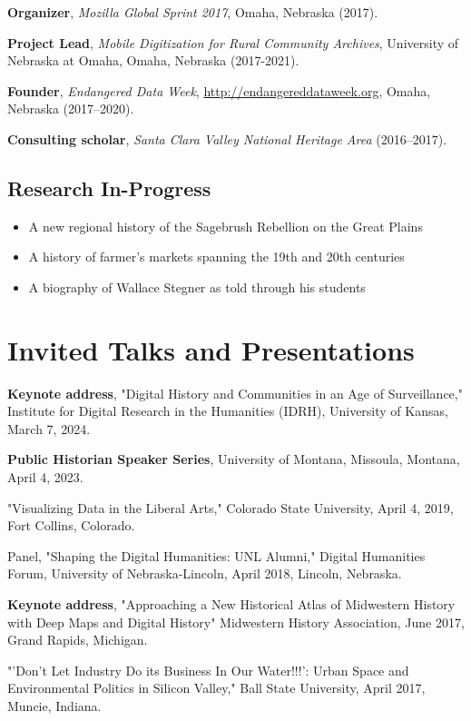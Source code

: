 \documentclass[10pt]{article}
\begin{document}
\textbf{Organizer}, \textit{Mozilla Global Sprint 2017}, Omaha, Nebraska (2017).

\textbf{Project Lead}, \textit{Mobile Digitization for Rural Community Archives}, University of Nebraska at Omaha, Omaha, Nebraska (2017-2021).

\textbf{Founder}, \textit{Endangered Data Week}, \url{http://endangereddataweek.org}, Omaha, Nebraska (2017--2020).

\textbf{Consulting scholar}, \textit{Santa Clara Valley National Heritage Area} (2016--2017).

\subsection*{Research In-Progress}\label{in-progress}

\begin{itemize}
\item A new regional history of the Sagebrush Rebellion on the Great Plains
\item A history of farmer's markets spanning the 19th and 20th centuries
\item A biography of Wallace Stegner as told through his students
\end{itemize}

\section{Invited Talks and Presentations}

\textbf{Keynote address}, "Digital History and Communities in an Age of Surveillance," Institute for Digital Research in the Humanities (IDRH), University of Kansas, March 7, 2024.

\textbf{Public Historian Speaker Series}, University of Montana, Missoula, Montana, April 4, 2023.

"Visualizing Data in the Liberal Arts," Colorado State University, April 4, 2019, Fort Collins, Colorado.

Panel, "Shaping the Digital Humanities: UNL Alumni," Digital Humanities Forum, University of Nebraska-Lincoln, April 2018, Lincoln, Nebraska.

\textbf{Keynote address}, "Approaching a New Historical Atlas of Midwestern History with Deep Maps and Digital History" Midwestern History Association, June 2017, Grand Rapids, Michigan.

"'Don't Let Industry Do its Business In Our Water!!!': Urban Space and Environmental Politics in Silicon Valley," Ball State University, April 2017, Muncie, Indiana.
\end{document}
